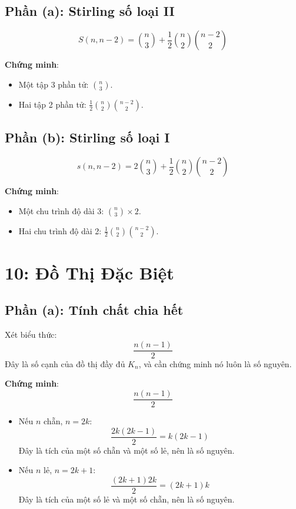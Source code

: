 \documentclass[a4paper,12pt]{article}
\theoremstyle{plain}
\theoremstyle{definition}
\begin{document}
\subsection*{Phần (a): Stirling số loại II}
\[
S(n,n-2) = \binom{n}{3} + \frac{1}{2}\binom{n}{2}\binom{n-2}{2}
\]

\textbf{Chứng minh}:
\begin{itemize}
    \item Một tập 3 phần tử: \( \binom{n}{3} \).
    \item Hai tập 2 phần tử: \( \frac{1}{2}\binom{n}{2}\binom{n-2}{2} \).
\end{itemize}

\subsection*{Phần (b): Stirling số loại I}
\[
s(n,n-2) = 2\binom{n}{3} + \frac{1}{2}\binom{n}{2}\binom{n-2}{2}
\]

\textbf{Chứng minh}:
\begin{itemize}
    \item Một chu trình độ dài 3: \( \binom{n}{3} \times 2 \).
    \item Hai chu trình độ dài 2: \( \frac{1}{2}\binom{n}{2}\binom{n-2}{2} \).
\end{itemize}



\section*{10: Đồ Thị Đặc Biệt}

\subsection*{Phần (a): Tính chất chia hết}

Xét biểu thức:
\[
\frac{n(n-1)}{2}
\]
Đây là số cạnh của đồ thị đầy đủ \( K_n \), và cần chứng minh nó luôn là số nguyên.

\textbf{Chứng minh}:
\[
\frac{n(n-1)}{2}
\]
\begin{itemize}
    \item Nếu \( n \) chẵn, \( n = 2k \):
    \[
    \frac{2k(2k-1)}{2} = k(2k-1)
    \]
    Đây là tích của một số chẵn và một số lẻ, nên là số nguyên.
    \item Nếu \( n \) lẻ, \( n = 2k+1 \):
    \[
    \frac{(2k+1)2k}{2} = (2k+1)k
    \]
    Đây là tích của một số lẻ và một số chẵn, nên là số nguyên.
\end{itemize}
\end{document}
